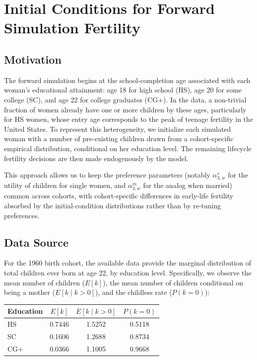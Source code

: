 
\section{Initial Conditions for Forward Simulation Fertility}
\label{app:initial_conditions}

\subsection{Motivation}

The forward simulation begins at the school-completion age associated with each woman's educational attainment: age 18 for high school (HS), age 20 for some college (SC), and age 22 for college graduates (CG+). In the data, a non-trivial fraction of women already have one or more children by these ages, particularly for HS women, whose entry age corresponds to the peak of teenage fertility in the United States. To represent this heterogeneity, we initialize each simulated woman with a number of pre-existing children drawn from a cohort-specific empirical distribution, conditional on her education level. The remaining lifecycle fertility decisions are then made endogenously by the model.

This approach allows us to keep the preference parameters (notably $\alpha_{3,w}^s$ for the utility of children for single women, and $\alpha_{3,w}^m$ for the analog when married) common across cohorts, with cohort-specific differences in early-life fertility absorbed by the initial-condition distributions rather than by re-tuning preferences.

\subsection{Data Source}

For the 1960 birth cohort, the available data provide the marginal distribution of total children ever born at age 22, by education level. Specifically, we observe the mean number of children ($E[k]$), the mean number of children conditional on being a mother ($E[k \mid k > 0]$), and the childless rate ($P(k=0)$):

\begin{center}
\begin{tabular}{lccc}
\toprule
Education & $E[k]$ & $E[k \mid k > 0]$ & $P(k=0)$ \\
\midrule
HS  & 0.7446 & 1.5252 & 0.5118 \\
SC  & 0.1606 & 1.2688 & 0.8734 \\
CG+ & 0.0366 & 1.1005 & 0.9668 \\
\bottomrule
\end{tabular}
\end{center}

